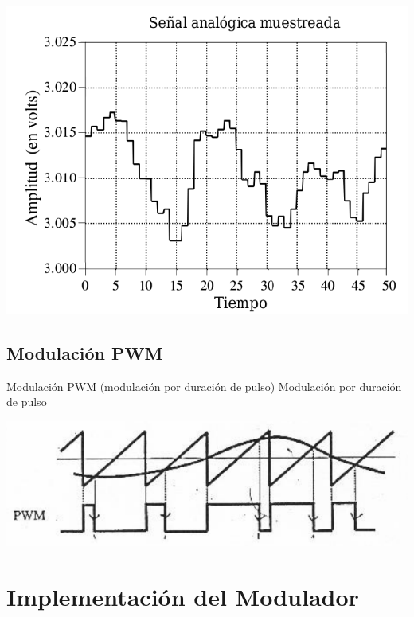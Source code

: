 \documentclass{if-beamer}
\begin{document}
\begin{frame}{}
\begin{center}
    \includegraphics[scale=0.4]{figuras/senal2.png}
\end{center}{}
    
\end{frame}{}

\subsection{Modulación PWM}
\begin{frame}{Modulación PWM (modulación por duración de pulso)}
    Modulación por duración de pulso 
    
    \begin{center}
        \includegraphics[scale=0.4]{figuras/pulso.png}
    \end{center}{}
    
\end{frame}{}
\section{Implementación del Modulador}
\end{document}
